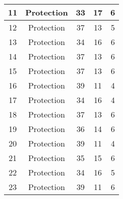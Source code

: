 \documentclass[results.tex]{subfiles}
\begin{document}
\begin{center}
\begin{tabular}{| c || c | c | c | c |}
            \hline
            11                      & Protection                   & 33                     & 17                      & 6                    \\
            \hline
            12                      & Protection                   & 37                     & 13                      & 5                    \\
            \hline
            13                      & Protection                   & 34                     & 16                      & 6                    \\
            \hline
            14                      & Protection                   & 37                     & 13                      & 6                    \\
            \hline
            15                      & Protection                   & 37                     & 13                      & 6                    \\
            \hline
            16                      & Protection                   & 39                     & 11                      & 4                    \\
            \hline
            17                      & Protection                   & 34                     & 16                      & 4                    \\
            \hline
            18                      & Protection                   & 37                     & 13                      & 6                    \\
            \hline
            19                      & Protection                   & 36                     & 14                      & 6                    \\
            \hline
            20                      & Protection                   & 39                     & 11                      & 4                    \\
            \hline
            21                      & Protection                   & 35                     & 15                      & 6                    \\
            \hline
            22                      & Protection                   & 34                     & 16                      & 5                    \\
            \hline
            23                      & Protection                   & 39                     & 11                      & 6                    \\

\end{tabular}
\end{center}
\end{document}

